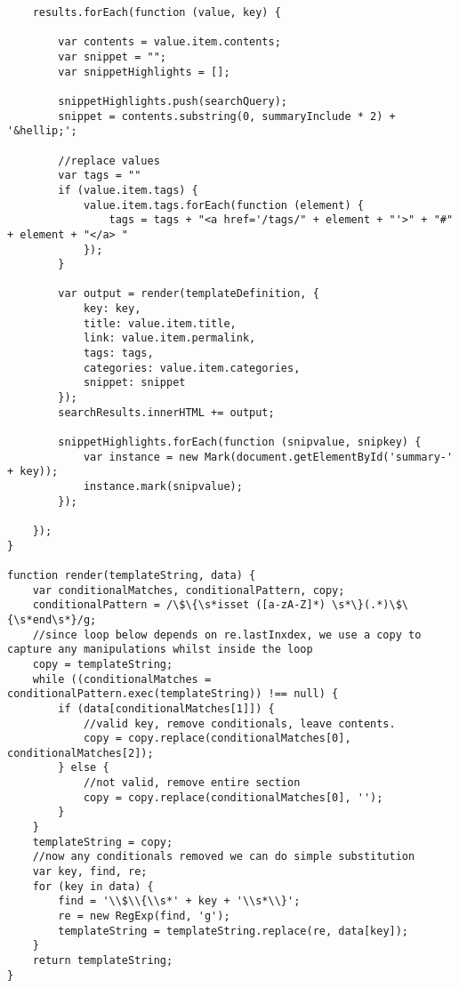 \documentclass[11pt]{article}
\begin{document}
\begin{verbatim}
    results.forEach(function (value, key) {

        var contents = value.item.contents;
        var snippet = "";
        var snippetHighlights = [];

        snippetHighlights.push(searchQuery);
        snippet = contents.substring(0, summaryInclude * 2) + '&hellip;';

        //replace values
        var tags = ""
        if (value.item.tags) {
            value.item.tags.forEach(function (element) {
                tags = tags + "<a href='/tags/" + element + "'>" + "#" + element + "</a> "
            });
        }

        var output = render(templateDefinition, {
            key: key,
            title: value.item.title,
            link: value.item.permalink,
            tags: tags,
            categories: value.item.categories,
            snippet: snippet
        });
        searchResults.innerHTML += output;

        snippetHighlights.forEach(function (snipvalue, snipkey) {
            var instance = new Mark(document.getElementById('summary-' + key));
            instance.mark(snipvalue);
        });

    });
}

function render(templateString, data) {
    var conditionalMatches, conditionalPattern, copy;
    conditionalPattern = /\$\{\s*isset ([a-zA-Z]*) \s*\}(.*)\$\{\s*end\s*}/g;
    //since loop below depends on re.lastInxdex, we use a copy to capture any manipulations whilst inside the loop
    copy = templateString;
    while ((conditionalMatches = conditionalPattern.exec(templateString)) !== null) {
        if (data[conditionalMatches[1]]) {
            //valid key, remove conditionals, leave contents.
            copy = copy.replace(conditionalMatches[0], conditionalMatches[2]);
        } else {
            //not valid, remove entire section
            copy = copy.replace(conditionalMatches[0], '');
        }
    }
    templateString = copy;
    //now any conditionals removed we can do simple substitution
    var key, find, re;
    for (key in data) {
        find = '\\$\\{\\s*' + key + '\\s*\\}';
        re = new RegExp(find, 'g');
        templateString = templateString.replace(re, data[key]);
    }
    return templateString;
}


\end{verbatim}
\end{document}
